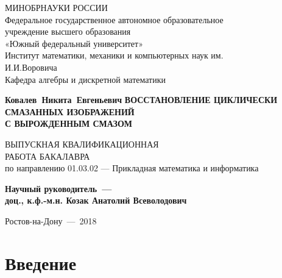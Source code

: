 \documentclass[a4paper]{article}
\renewcommand{\normalsize}{\fontsize{14}{16pt}\selectfont}
\renewcommand{\large}{\fontsize{17}{20pt}\selectfont}
\theoremstyle{definition}
\begin{document}
\normalsize

    \thispagestyle{empty}
    \begin{titlepage}
    \begin{center}


    \vfill
    МИНОБРНАУКИ РОССИИ\\
    \vspace*{0.3cm}
    Федеральное государственное автономное образовательное\\
    учреждение высшего образования\\
    «Южный федеральный университет»\\
    \vspace*{0.3cm}
    Институт математики, механики и компьютерных наук им.\\
    И.И.Воровича\\
    Кафедра алгебры и дискретной математики
    \vfill


    \bigskip


    {\large\bf Ковалев~Никита~Евгеньевич}
    \vfill
    {\large\bf ВОССТАНОВЛЕНИЕ ЦИКЛИЧЕСКИ\\СМАЗАННЫХ ИЗОБРАЖЕНИЙ\\
               С ВЫРОЖДЕННЫМ СМАЗОМ}

\fontsize{14}{16pt}\selectfont

    \vfill
    ВЫПУСКНАЯ КВАЛИФИКАЦИОННАЯ\\ РАБОТА БАКАЛАВРА\\
    по направлению 01.03.02 — Прикладная математика и информатика
    \vfill

    {\bf Научный руководитель~---\\
         доц., к.ф.-м.н. Козак Анатолий Всеволодович}



    \vfill

    \end{center}

    \bigskip

    \begin{center}
        Ростов-на-Дону~---~2018
    \end{center}

    \end{titlepage}

    \tableofcontents
    \newpage


    \section*{Введение}
\end{document}
